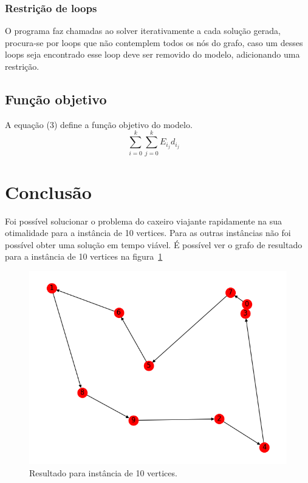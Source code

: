 \documentclass{article}
\begin{document}
    \subsubsection{Restrição de loops}
    O programa faz chamadas ao solver iterativamente a cada solução gerada, procura-se por loops que não contemplem todos os nós do grafo, caso um
    desses loops seja encontrado esse loop deve ser removido do modelo, adicionando uma restrição.


    \subsection{Função objetivo}
    A equação (3) define a função objetivo do modelo.
    \begin{equation}
        \sum_{i = 0}^{k} \sum_{j = 0}^{k} E_i_j d_i_j \quad
    \end{equation}

    \section{Conclusão}
    Foi possível solucionar o problema do caxeiro viajante rapidamente na sua otimalidade para a instância de 10 vertices.
    Para as outras instâncias não foi possível obter uma solução em tempo viável.
    É possível ver o grafo de resultado para a instância de 10 vertices na figura~\ref{fig:Grafo}

    \begin{figure}
        \includegraphics[width=\linewidth]{res_10.png}
        \caption{Resultado para instância de 10 vertices.}
        \label{fig:Grafo}
    \end{figure}
\end{document}
